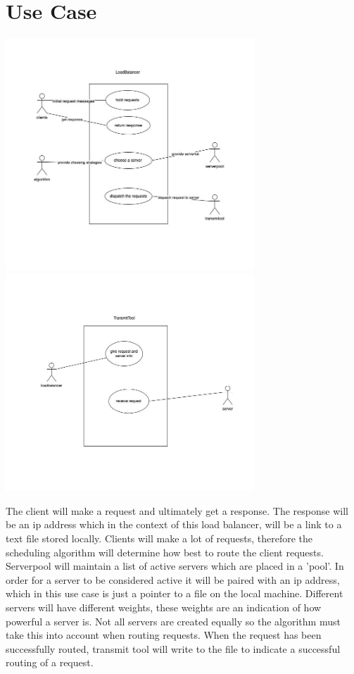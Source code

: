 \documentclass{article}
\begin{document}
\section{Use Case}
\includegraphics[width=0.7\textwidth,center]{LoadBalancer_usecase.jpeg}
\includegraphics[width=0.7\textwidth,center]{TransmitTool_usecase.jpeg}

The client will make a request and ultimately get a response. The response will be an ip address which in the context of this load balancer, will be a link to a text file stored locally. Clients will make a lot of requests, therefore the scheduling algorithm will determine how best to route the client requests. Serverpool will maintain a list of active servers which are placed in a 'pool'. In order for a server to be considered active it will be paired with an ip address, which in this use case is just a pointer to a file on the local machine. Different servers will have different weights, these weights are an indication of how powerful a server is. Not all servers are created equally so the algorithm must take this into account when routing requests. When the request has been successfully routed, transmit tool will write to the file to indicate a successful routing of a request.
\end{document}
